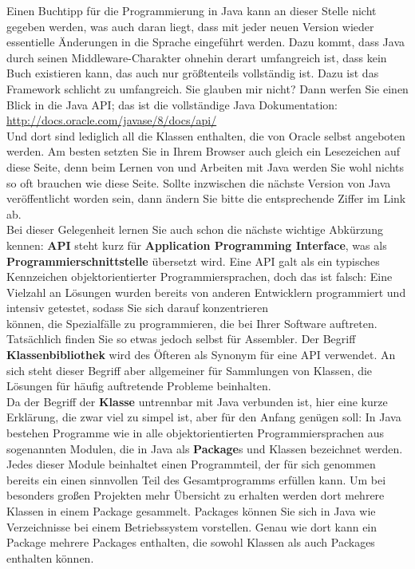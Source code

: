 Einen Buchtipp für die Programmierung in Java kann an dieser Stelle nicht gegeben werden, was auch daran liegt, dass mit jeder neuen Version wieder essentielle Änderungen in die Sprache eingeführt werden. Dazu kommt, dass Java durch seinen Middleware-Charakter ohnehin derart umfangreich ist, dass kein Buch existieren kann, das auch nur größtenteils vollständig ist. Dazu ist das Framework schlicht zu umfangreich. Sie glauben mir nicht? Dann werfen Sie einen Blick in die Java API; das ist die vollständige Java Dokumentation: \url{http://docs.oracle.com/javase/8/docs/api/} \\ Und dort sind lediglich all die Klassen enthalten, die von Oracle selbst angeboten werden. Am besten setzten Sie in Ihrem Browser auch gleich ein Lesezeichen auf diese Seite, denn beim Lernen von und Arbeiten mit Java werden Sie wohl nichts so oft brauchen wie diese Seite. Sollte inzwischen die nächste Version von Java veröffentlicht worden sein, dann ändern Sie bitte die entsprechende Ziffer im Link ab.\\

Bei dieser Gelegenheit lernen Sie auch schon die nächste wichtige Abkürzung kennen: \textbf{API} steht kurz für \textbf{Application Programming Interface}, was als \textbf{Programmierschnittstelle} übersetzt wird. Eine API galt als ein typisches Kennzeichen objektorientierter Programmiersprachen, doch das ist falsch: Eine Vielzahl an Lösungen wurden bereits von anderen Entwicklern programmiert und intensiv getestet, sodass Sie sich darauf konzentrieren\\ können, die Spezialfälle zu programmieren, die bei Ihrer Software auftreten. Tatsächlich finden Sie so etwas jedoch selbst für Assembler. Der Begriff \textbf{Klassenbibliothek} wird des Öfteren als Synonym für eine API verwendet. An sich steht dieser Begriff aber allgemeiner für Sammlungen von Klassen, die Lösungen für häufig auftretende Probleme beinhalten.\\

Da der Begriff der \textbf{Klasse} untrennbar mit Java verbunden ist, hier eine kurze Erklärung, die zwar viel zu simpel ist, aber für den Anfang genügen soll: In Java bestehen Programme wie in alle objektorientierten Programmiersprachen aus sogenannten Modulen, die in Java als \textbf{Package}s und Klassen bezeichnet werden. Jedes dieser Module beinhaltet einen Programmteil, der für sich genommen bereits ein einen sinnvollen Teil des Gesamtprogramms erfüllen kann. Um bei besonders großen Projekten mehr Übersicht zu erhalten werden dort mehrere Klassen in einem Package gesammelt. Packages können Sie sich in Java wie Verzeichnisse bei einem Betriebssystem vorstellen. Genau wie dort kann ein Package mehrere Packages enthalten, die sowohl Klassen als auch Packages enthalten können.\\

